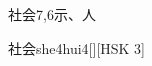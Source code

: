 \begin{entry}{社会}{7,6}{⽰、⼈}
  \begin{phonetics}{社会}{she4hui4}[][HSK 3]
  \end{phonetics}
\end{entry}
